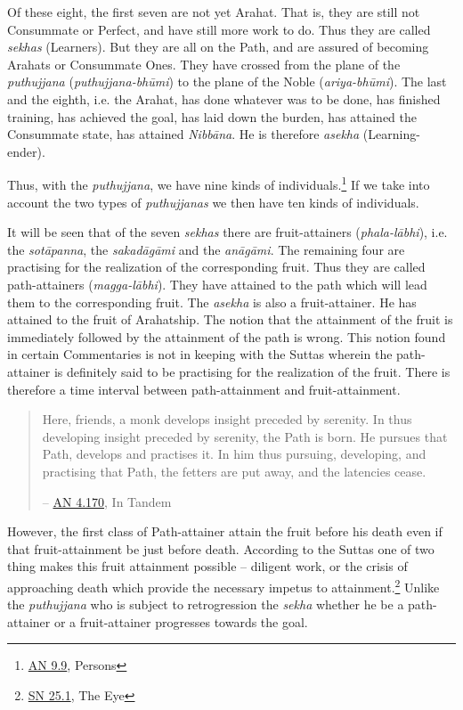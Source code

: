 Of these eight, the first seven are not yet Arahat. That is, they are still not Consummate or Perfect, and have still more work to do. Thus they are called \emph{sekhas} (Learners). But they are all on the Path, and are assured of becoming Arahats or Consummate Ones. They have crossed from the plane of the \emph{puthujjana} (\emph{puthujjana-bhūmi}) to the plane of the Noble (\emph{ariya-bhūmi}). The last and the eighth, i.e. the Arahat, has done whatever was to be done, has finished training, has achieved the goal, has laid down the burden, has attained the Consummate state, has attained \emph{Nibbāna}. He is therefore \emph{asekha} (Learning-ender).

Thus, with the \emph{puthujjana}, we have nine kinds of individuals.\footnote{\href{https://suttacentral.net/an9.9/en/sujato}{AN 9.9}, Persons} If we take into account the two types of \emph{puthujjanas} we then have ten kinds of individuals.

It will be seen that of the seven \emph{sekhas} there are fruit-attainers (\emph{phala-lābhi}), i.e. the \emph{sotāpanna}, the \emph{sakadāgāmi} and the \emph{anāgāmi}. The remaining four are practising for the realization of the corresponding fruit. Thus they are called path-attainers (\emph{magga-lābhi}). They have attained to the path which will lead them to the corresponding fruit. The \emph{asekha} is also a fruit-attainer. He has attained to the fruit of Arahatship. The notion that the attainment of the fruit is immediately followed by the attainment of the path is wrong. This notion found in certain Commentaries is not in keeping with the Suttas wherein the path-attainer is definitely said to be practising for the realization of the fruit. There is therefore a time interval between path-attainment and fruit-attainment.

\begin{quote}
Here, friends, a monk develops insight preceded by serenity. In thus developing insight preceded by serenity, the Path is born. He pursues that Path, develops and practises it. In him thus pursuing, developing, and practising that Path, the fetters are put away, and the latencies cease.

 -- \href{https://suttacentral.net/an4.170/en/thanissaro}{AN 4.170}, In Tandem
\end{quote}

However, the first class of Path-attainer  attain the fruit before his death even if that fruit-attainment be just before death. According to the Suttas one of two thing makes this fruit attainment possible -- diligent work, or the crisis of approaching death which provide the necessary impetus to attainment.\footnote{\href{https://suttacentral.net/sn25.1/en/sujato}{SN 25.1}, The Eye} Unlike the \emph{puthujjana} who is subject to retrogression the \emph{sekha} whether he be a path-attainer or a fruit-attainer progresses towards the goal.

